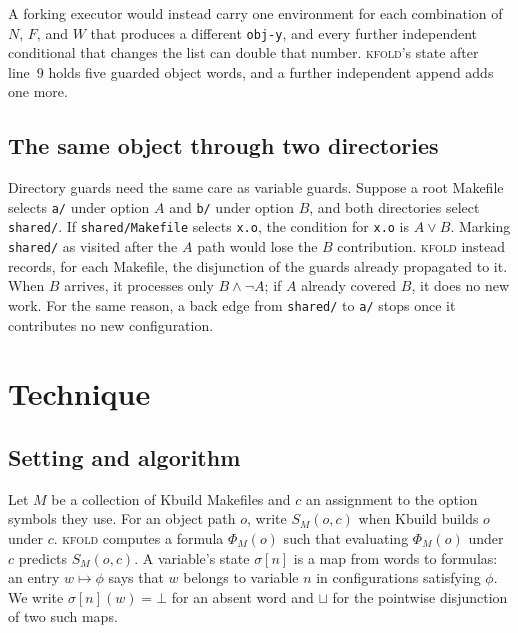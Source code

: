 \documentclass[acmsmall,screen,review]{acmart}
\newcommand{\tool}{\textsc{kfold}\xspace}
\begin{document}
A forking executor would instead carry one environment for each combination of $N$, $F$, and $W$ that produces a different \texttt{obj-y}, and every further independent conditional that changes the list can double that number. \tool's state after line~9 holds five guarded object words, and a further independent append adds one more.

\subsection{The same object through two directories}
\label{sec:overview:directories}
Directory guards need the same care as variable guards. Suppose a root Makefile selects \texttt{a/} under option $A$ and \texttt{b/} under option $B$, and both directories select \texttt{shared/}. If \texttt{shared/Makefile} selects \texttt{x.o}, the condition for \texttt{x.o} is $A\lor B$. Marking \texttt{shared/} as visited after the $A$ path would lose the $B$ contribution. \tool instead records, for each Makefile, the disjunction of the guards already propagated to it. When $B$ arrives, it processes only $B\land\neg A$; if $A$ already covered $B$, it does no new work. For the same reason, a back edge from \texttt{shared/} to \texttt{a/} stops once it contributes no new configuration.

\section{Technique}
\label{sec:design}

\subsection{Setting and algorithm}
\label{sec:design:alg}
Let $M$ be a collection of Kbuild Makefiles and $c$ an assignment to the option symbols they use. For an object path $o$, write $S_M(o,c)$ when Kbuild builds $o$ under $c$. \tool computes a formula $\Phi_M(o)$ such that evaluating $\Phi_M(o)$ under $c$ predicts $S_M(o,c)$. A variable's state $\sigma[n]$ is a map from words to formulas: an entry $w\mapsto\phi$ says that $w$ belongs to variable $n$ in configurations satisfying $\phi$. We write $\sigma[n](w)=\bot$ for an absent word and $\sqcup$ for the pointwise disjunction of two such maps.
\end{document}
